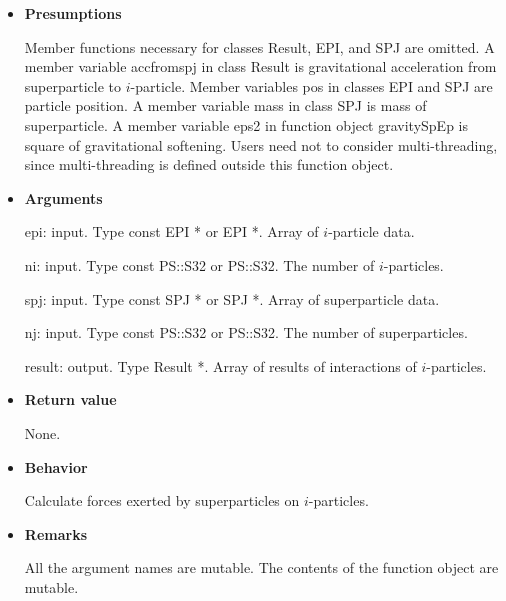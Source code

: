 \begin{itemize}

\item {\bf Presumptions}

  Member functions necessary for classes Result, EPI, and SPJ are
  omitted. A member variable accfromspj in class Result is
  gravitational acceleration from superparticle to
  $i$-particle. Member variables pos in classes EPI and SPJ are
  particle position. A member variable mass in class SPJ is mass of
  superparticle. A member variable eps2 in function object gravitySpEp
  is square of gravitational softening. Users need not to consider
  multi-threading, since multi-threading is defined outside this
  function object.

\item {\bf Arguments}

  epi: input. Type const EPI * or EPI *. Array of $i$-particle data.

  ni: input. Type const PS::S32 or PS::S32. The number of
  $i$-particles.

  spj: input. Type const SPJ * or SPJ *. Array of superparticle data.
  
  nj: input. Type const PS::S32 or PS::S32. The number of
  superparticles.

  result: output. Type Result *. Array of results of interactions of
  $i$-particles.

\item {\bf Return value}

  None.
  
\item {\bf Behavior}

  Calculate forces exerted by superparticles on $i$-particles.
  
\item {\bf Remarks}

  All the argument names are mutable. The contents of the function
  object are mutable.
  
\end{itemize}



